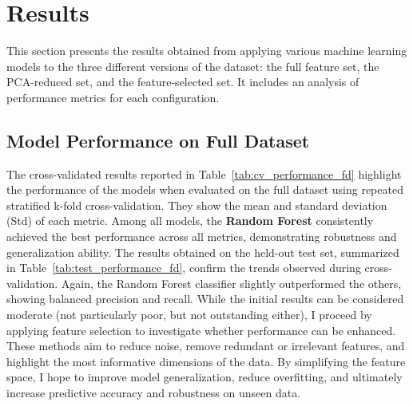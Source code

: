 \section{Results}

This section presents the results obtained from applying various machine learning models to the three different versions of the dataset: the full feature set, the PCA-reduced set, and the feature-selected set. It includes an analysis of performance metrics for each configuration.

\subsection{Model Performance on Full Dataset}

The cross-validated results reported in Table~\ref{tab:cv_performance_fd} highlight the performance of the models when evaluated on the full dataset using repeated stratified k-fold cross-validation. They show the mean and standard deviation (Std) of each metric. Among all models, the \textbf{Random Forest} consistently achieved the best performance across all metrics, demonstrating robustness and generalization ability.
\noindent
The results obtained on the held-out test set, summarized in Table~\ref{tab:test_performance_fd}, confirm the trends observed during cross-validation. Again, the Random Forest classifier slightly outperformed the others, showing balanced precision and recall.
\noindent
While the initial results can be considered moderate (not particularly poor, but not outstanding either), I proceed by applying feature selection to investigate whether performance can be enhanced. These methods aim to reduce noise, remove redundant or irrelevant features, and highlight the most informative dimensions of the data. By simplifying the feature space, I hope to improve model generalization, reduce overfitting, and ultimately increase predictive accuracy and robustness on unseen data.



